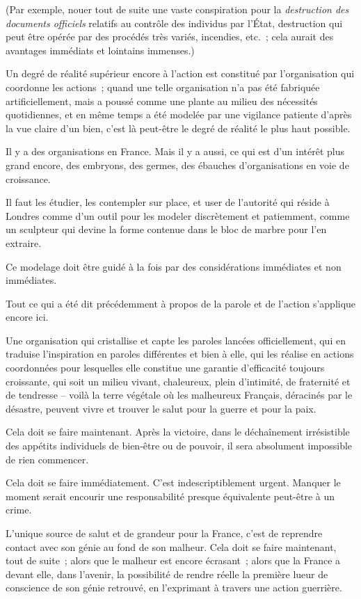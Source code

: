 \documentclass[french,twoside]{book} %
\begin{document}
(Par exemple, nouer tout de suite une vaste conspiration pour la {\itshape destruction des documents officiels} relatifs au contrôle des individus par l’État, destruction qui peut être opérée par des procédés très variés, incendies, etc. ; cela aurait des avantages immédiats et lointains immenses.)\par
Un degré de réalité supérieur encore à l'action est constitué par l'organisation qui coordonne les actions ; quand une telle organisation n'a pas été fabriquée artificiellement, mais a poussé comme une plante au milieu des nécessités quotidiennes, et en même temps a été modelée par une vigilance patiente d'après la vue claire d'un bien, c'est là peut-être le degré de réalité le plus haut possible.\par
Il y a des organisations en France. Mais il y a aussi, ce qui est d'un intérêt plus grand encore, des embryons, des germes, des ébauches d'organisations en voie de croissance.\par
Il faut les étudier, les contempler sur place, et user de l'autorité qui réside à Londres comme d'un outil pour les modeler discrètement et patiemment, comme un sculpteur qui devine la forme contenue dans le bloc de marbre pour l'en extraire.\par
Ce modelage doit être guidé à la fois par des considérations immédiates et non immédiates.\par
Tout ce qui a été dit précédemment à propos de la parole et de l'action s'applique encore ici.\par
Une organisation qui cristallise et capte les paroles lancées officiellement, qui en traduise l'inspiration en paroles différentes et bien à elle, qui les réalise en actions coordonnées pour lesquelles elle constitue une garantie d'efficacité toujours croissante, qui soit un milieu vivant, chaleureux, plein d'intimité, de fraternité et de tendresse – voilà la terre végétale où les malheureux Français, déracinés par le désastre, peuvent vivre et trouver le salut pour la guerre et pour la paix.\par
Cela doit se faire maintenant. Après la victoire, dans le déchaînement irrésistible des appétits individuels de bien-être ou de pouvoir, il sera absolument impossible de rien commencer.\par
Cela doit se faire immédiatement. C'est indescriptiblement urgent. Manquer le moment serait encourir une responsabilité presque équivalente peut-être à un crime.\par
L'unique source de salut et de grandeur pour la France, c'est de reprendre contact avec son génie au fond de son malheur. Cela doit se faire maintenant, tout de suite ; alors que le malheur est encore écrasant ; alors que la France a devant elle, dans l'avenir, la possibilité de rendre réelle la première lueur de conscience de son génie retrouvé, en l'exprimant à travers une action guerrière.\par
\end{document}
